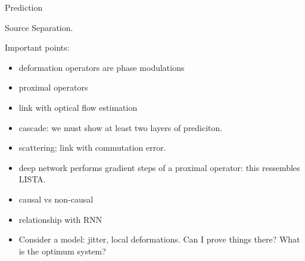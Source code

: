 \documentclass[11pt]{article} %
\begin{document}
Prediction

Source Separation.





Important points:

\begin{itemize}
\item deformation operators are phase modulations 
\item proximal operators
\item link with optical flow estimation
\item cascade: we must show at least two layers of prediciton.
\item scattering; link with commutation error.
\item deep network performs gradient steps of a proximal operator: this ressembles LISTA.
\item causal vs non-causal
\item relationship with RNN
\item Consider a model: jitter, local deformations. Can I prove things there? What is the optimum system?
\end{itemize}
\end{document}
